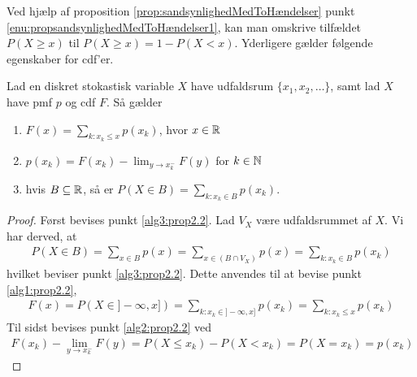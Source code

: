 Ved hjælp af proposition \ref{prop:sandsynlighedMedToHændelser} punkt \ref{enu:propsandsynlighedMedToHændelser1}, kan man omskrive tilfældet $P(X\geq x)$ til $P(X\geq x)=1-P(X<x)$. Yderligere gælder følgende egenskaber for cdf'er. 

\begin{prop}%
Lad en diskret stokastisk variable $X$ have udfaldsrum $\{x_1, x_2, \ldots\}$, samt lad $X$ have pmf $p$ og cdf $F$. Så gælder
\begin{enumerate}
    \item $F(x)=\displaystyle \sum_{k:x_k \leq x} p(x_k)$, hvor $x\in \mathbb{R}$ \label{alg1:prop2.2}
    \item $p(x_k)=F(x_k)- \displaystyle \lim_{y \rightarrow x_k^- } F(y)$ for $k\in \mathbb{N} $ \label{alg2:prop2.2}
    \item hvis $B \subseteq \mathbb{R}$, så er $P(X \in B)= \displaystyle \sum_{k:x_k \in B} p(x_k)$. \label{alg3:prop2.2}
\end{enumerate}
\end{prop} 
\begin{proof}
Først bevises punkt \ref{alg3:prop2.2}. Lad $V_X$ være udfaldsrummet af $X$. Vi har derved, at
\begin{align*}
    P(X\in B)=\sum_{x\in B}p(x)=\sum_{x\in(B\cap V_X)}p(x)=\sum_{k:x_k\in B}p(x_k)
\end{align*}
hvilket beviser punkt \ref{alg3:prop2.2}. Dette anvendes til at bevise punkt \ref{alg1:prop2.2},
\begin{align*}
    F(x)=P(X\in]-\infty,x])=\sum_{k:x_k\in ]-\infty,x]}p(x_k)=\sum_{k:x_k\leq x}p(x_k)
\end{align*}
Til sidst bevises punkt \ref{alg2:prop2.2} ved
\begin{align*}
    F(x_k)-\lim_{y\rightarrow x_k^-}F(y)=P(X\leq x_k)-P(X<x_k)=P(X=x_k)=p(x_k)
\end{align*}
\end{proof}

